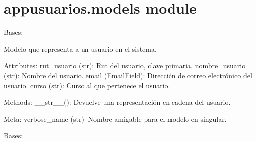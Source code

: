 \documentclass[letterpaper,10pt,spanish]{sphinxmanual}
\begin{document}
\section{appusuarios.models module}
\label{\detokenize{modules/appusuarios:module-appusuarios.models}}\label{\detokenize{modules/appusuarios:appusuarios-models-module}}

\begin{fulllineitems}
\label{\detokenize{modules/appusuarios:appusuarios.models.Usuario}}
\pysigstartsignatures
{}
\pysigstopsignatures
\sphinxAtStartPar
Bases: 

\sphinxAtStartPar
Modelo que representa a un usuario en el sistema.

\sphinxAtStartPar
Attributes:
\sphinxhyphen{} rut\_usuario (str): Rut del usuario, clave primaria.
\sphinxhyphen{} nombre\_usuario (str): Nombre del usuario.
\sphinxhyphen{} email (EmailField): Dirección de correo electrónico del usuario.
\sphinxhyphen{} curso (str): Curso al que pertenece el usuario.

\sphinxAtStartPar
Methods:
\sphinxhyphen{} \_\_str\_\_(): Devuelve una representación en cadena del usuario.

\sphinxAtStartPar
Meta:
\sphinxhyphen{} verbose\_name (str): Nombre amigable para el modelo en singular.

\begin{fulllineitems}
\label{\detokenize{modules/appusuarios:appusuarios.models.Usuario.DoesNotExist}}
\pysigstartsignatures
{}
\pysigstopsignatures
\sphinxAtStartPar
Bases: 

\end{fulllineitems}



\end{fulllineitems}
\end{document}
